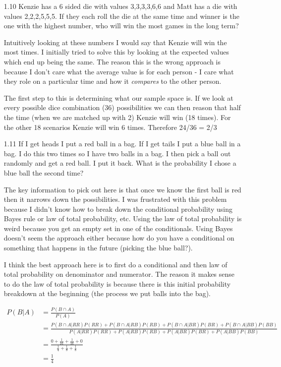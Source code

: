 \begin{enumerate}
\item[1.10]
Kenzie has a 6 sided die with values 3,3,3,3,6,6 and Matt has a die with values 2,2,2,5,5,5. If they each roll the die at the same time and winner is the one with the highest number, who will win the most games in the long term?

Intuitively looking at these numbers I would say that Kenzie will win the most times. I initially tried to solve this by looking at the expected values which end up being the same. The reason this is the wrong approach is because I don't care what the average value is for each person - I care what they role on a particular time and how it \emph{compares} to the other person.

The first step to this is determining what our sample space is. If we look at every possible dice combination (36) possibilities we can then reason that half the time (when we are matched up with 2) Kenzie will win (18 times). For the other 18 scenarios Kenzie will win 6 times. Therefore 24/36 = 2/3

\item[1.11]
If I get heads I put a red ball in a bag. If I get tails I put a blue ball in a bag. I do this two times so I have two balls in a bag. I then pick a ball out randomly and get a red ball. I put it back. What is the probability I chose a blue ball the second time?

The key information to pick out here is that once we know the first ball is red then it narrows down the possibilities. I was frustrated with this problem because I didn't know how to break down the conditional probability using Bayes rule or law of total probability, etc. Using the law of total probability is weird because you get an empty set in one of the conditionals. Using Bayes doesn't seem the approach either because how do you have a conditional on something that happens in the future (picking the blue ball?).

I think the best approach here is to first do a conditional and then law of total probability on denominator and numerator. The reason it makes sense to do the law of total probability is because there is this initial probability breakdown at the beginning (the process we put balls into the bag).

\begin{equation}
\begin{split}
P(B|A)  & = \frac{P(B \cap A)}{P(A)} \\
&=  \frac{P(B \cap A|RR)P(RR) + P(B \cap A|RB)P(RB) + P(B \cap A|BR)P(BR) + P(B \cap A|BB)P(BB)}{P(A|RR)P(RR) + P(A|RB)P(RB) + P(A|BR)P(BR) + P(A|BB)P(BB) } \\
&= \frac{0 + \frac{1}{16} + \frac{1}{16} + 0}{\frac{1}{4} + \frac{1}{8} + \frac{1}{8}} \\
&= \frac{1}{4}
\end{split}
\end{equation}


\end{enumerate}
